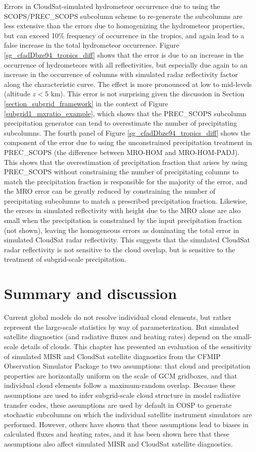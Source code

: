 Errors in CloudSat-simulated hydrometeor occurrence due to using the SCOPS/PREC\_SCOPS subcolumn scheme to re-generate the subcolumns are less extensive than the errors due to homogenizing the hydrometeor properties, but can exceed 10\% frequency of occurrence in the tropics, and again lead to a false increase in the total hydrometeor occurrence. Figure \ref{sg_cfadDbze94_tropics_diff} shows that the error is due to an increase in the occurrence of hydrometeors with all reflectivities, but especially due again to an increase in the occurrence of columns with simulated radar reflectivity factor along the characteristic curve. The effect is more pronounced at low to mid-levels (altitude $z < 5$ km). This error is not surprising given the discussion in Section \ref{section_subgrid_framework} in the context of Figure \ref{subgrid1_mxratio_example}, which shows that the PREC\_SCOPS subcolumn precipitation generator can tend to overestimate the number of precipitating subcolumns. The fourth panel of Figure \ref{sg_cfadDbze94_tropics_diff} shows the component of the error due to using the unconstrained precipitation treatment in PREC\_SCOPS (the difference between MRO-HOM and MRO-HOM-PADJ). This shows that the overestimation of precipitation fraction that arises by using PREC\_SCOPS without constraining the number of precipitating columns to match the precipitation fraction is responsible for the majority of the error, and the MRO error can be greatly reduced by constraining the number of precipitating subcolumns to match a prescribed precipitation fraction. Likewise, the errors in simulated reflectivity with height due to the MRO alone are also small when the precipitation is constrained by the input precipitation fraction (not shown), leaving the homogeneous errors as dominating the total error in simulated CloudSat radar reflectivity. This suggests that the simulated CloudSat radar reflectivity is not sensitive to the cloud overlap, but is sensitive to the treatment of subgrid-scale precipitation.

\section{Summary and discussion} Current global models do not resolve individual cloud elements, but rather represent the large-scale statistics by way of parameterization. But simulated satellite diagnostics (and radiative fluxes and heating rates) depend on the small-scale details of clouds. This chapter has presented an evaluation of the sensitivity of simulated MISR and CloudSat satellite diagnostics from the CFMIP Observation Simulator Package to two assumptions: that cloud and precipitation properties are horizontally uniform on the scale of GCM gridboxes, and that individual cloud elements follow a maximum-random overlap. Because these assumptions are used to infer subgrid-scale cloud structure in model radiative transfer codes, these assumptions are used by default in COSP to generate stochastic subcolumns on which the individual satellite instrument simulators are performed. However, others have shown that these assumptions lead to biases in calculated fluxes and heating rates, and it has been shown here that these assumptions also affect simulated MISR and CloudSat satellite diagnostics.  

